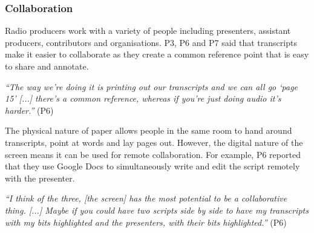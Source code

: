 




\subsubsection{Collaboration}
Radio producers work with a variety of people including presenters, assistant producers, contributors and
organisations.  P3, P6 and P7 said that transcripts make it easier to collaborate as they create a common reference
point that is easy to share and annotate.

\textit{``The way we're doing it is printing out our transcripts and we can all go `page 15' [...]
there's a common reference, whereas if you're just doing audio it's harder.''} (P6)

The physical nature of paper allows people in the same room to hand around transcripts, point at words and lay pages
out. However, the digital nature of the screen means it can be used for remote collaboration. For example, P6 reported
that they use Google Docs to simultaneously write and edit the script remotely with the presenter.



\textit{``I think of the three, [the screen] has the most potential to be a collaborative thing. [...]
  Maybe if you could have two scripts side by side to have my transcripts with my bits highlighted and the presenters,
with their bits highlighted.''} (P6)


